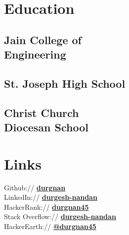 \documentclass[]{deedy-resume-openfont}
\begin{document}
%
%

%
%

%
%

\begin{minipage}[t]{0.33\textwidth} 


\section{Education} 

\subsection{Jain College of \\Engineering}
\sectionsep

\subsection{St. Joseph High School}
\sectionsep

\subsection{Christ Church \\Diocesan School}


\section{Links} 
Github:// \href{https://github.com/durgnan}{\bf durgnan} \\
LinkedIn://  \href{https://www.linkedin.com/in/durgesh-nandan-75a80b140}{\bf durgesh-nandan} \\
HackerRank://  \href{https://www.hackerrank.com/durgnan45}{\bf durgnan45} \\
Stack Overflow://  \href{https://stackoverflow.com/users/11324413/durgesh-nandan}{\bf durgesh-nandan} \\
HackerEarth://  \href{https://www.hackerearth.com/@durgnan45}{\bf @durgnan45}


\end{minipage}
\end{document}
